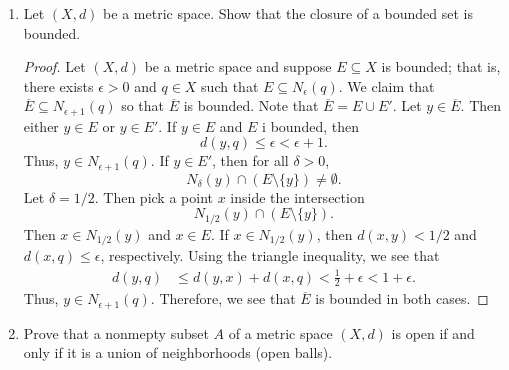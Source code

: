 \documentclass[a4paper]{article}
\begin{document}
\begin{enumerate}
\begin{proof}
        With (2), suppose \( x \in A  \). We want to show that \( x \in \overline{E} \); that is, \( x  \) is either a limit point of \( E  \) or an element of \( E  \). Suppose that \( x  \) is NOT an element of \( E  \). By definition of \( A  \), we see that for all \( \epsilon > 0 \), 
        \[  {N}_{\epsilon}(x) \cap E \neq \emptyset.  \]
        Note that \( x \notin E  \) implies that \( E \setminus \{ x \} = E    \) and so we have 
        \[  {N}_{\epsilon}(x) \cap ( E \setminus  \{ x \} ) \neq \emptyset. \]
        Thus, \( x  \) is a limit point of \( E  \) and so \( x \in \overline{E} \). Otherwise, when \( x  \) is not a limit point of \( E  \), then the nonempty intersection
        \[  {N}_{\epsilon}(x) \cap E  \]
        implies that \( x \in E  \) and so \( x \in \overline{E} \). Thus, \( A \subseteq \overline{E} \).
    \end{proof}
\item Let \( (X,d) \) be a metric space. Show that the closure of a bounded set is bounded.
    \begin{proof}
        Let \( (X,d) \) be a metric space and suppose \( E \subseteq X \) is bounded; that is, there exists \( \epsilon > 0  \) and \( q \in X  \) such that \( E \subseteq {N}_{\epsilon}(q)  \). We claim that \( \overline{E} \subseteq {N}_{\epsilon + 1}(q) \) so that \( \overline{E} \) is bounded. Note that \( \overline{E } = E \cup E' \). Let \( y \in \overline{E} \). Then either \( y \in E  \) or \( y \in E' \). If \( y \in E  \) and \( E  \) i bounded, then   
        \[  d(y,q) \leq \epsilon < \epsilon + 1.  \]
        Thus, \( y \in {N}_{\epsilon + 1 }(q) \). If \( y \in E' \), then for all \( \delta > 0  \),
        \[  {N}_{\delta}(y) \cap (E \setminus  \{ y \} ) \neq \emptyset. \]
        Let \( \delta = 1/2 \). Then pick a point \( x  \) inside the intersection 
        \[  {N}_{1/2}(y) \cap (E \setminus  \{ y \} ).    \]
        Then \( x \in {N}_{1/2}(y) \) and \( x \in E  \). If \( x \in {N}_{1/2}(y) \), then \( d(x,y) < 1/2  \) and \( d(x,q) \leq \epsilon  \), respectively. Using the triangle inequality, we see that 
        \begin{align*}
            d(y,q) &\leq d(y,x) + d(x,q)
                   < \frac{ 1 }{ 2 }  + \epsilon 
                   < 1 + \epsilon.
        \end{align*}
        Thus, \( y \in {N}_{\epsilon + 1}(q) \). Therefore, we see that \( \overline{E} \) is bounded in both cases.
    \end{proof}
\item Prove that a nonmepty subset \( A  \) of a metric space \( (X,d) \) is open if and only if it is a union of neighborhoods (open balls).

\end{enumerate}
\end{document}
